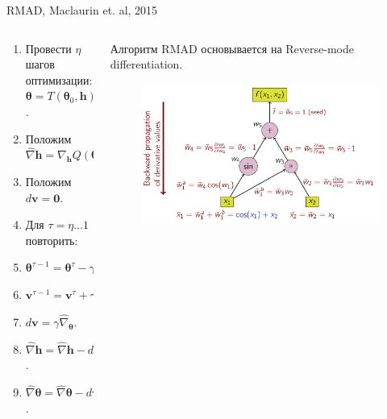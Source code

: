 \documentclass[10pt,pdf,utf8,russian,aspectratio=169]{beamer}
\begin{document}
\begin{frame}{RMAD, Maclaurin et. al, 2015 }
\begin{columns}
\begin{column}{0.5\textwidth}
\begin{enumerate}
\item Провести $\eta$ шагов оптимизации: $\boldsymbol{\theta} = T(\boldsymbol{\theta}_0, \mathbf{h})$.
\item Положим $\hat{\nabla} \mathbf{h} = \nabla_\mathbf{h} Q(\boldsymbol{\theta}, \mathbf{h}).$ 
\item Положим $d\mathbf{v} = \mathbf{0}.$
\item Для $\tau = \eta \dots 1 $ повторить:
\item $\boldsymbol{\theta}^{\tau-1} =  \boldsymbol{\theta}^{\tau} - \gamma\mathbf{v}^{\tau}.$
\item $\mathbf{v}^{\tau-1} =\mathbf{v}^{\tau} + \gamma \hat{\nabla}_{\boldsymbol{\theta}}.$
\item $d\mathbf{v} =  \gamma \hat{\nabla}_{\boldsymbol{\theta}}$.
\item $\hat{\nabla} \mathbf{h} =  \hat{\nabla} \mathbf{h} - d\mathbf{v}\nabla_{\mathbf{h}} \nabla_{\boldsymbol{\theta}} Q$.
\item $\hat{\nabla} \boldsymbol{\theta}  = \hat{\nabla} \boldsymbol{\theta}  - d\mathbf{v}\nabla_{\boldsymbol{\theta}} \nabla_{\boldsymbol{\theta}} Q$.
\end{enumerate}
\end{column}

\begin{column}{0.5\textwidth}
Алгоритм RMAD основывается на Reverse-mode differentiation.
\begin{figure}
\includegraphics[width=\textwidth]{rmd.png}
\end{figure}
\end{column}
\end{columns}
\end{frame}
\end{document}
